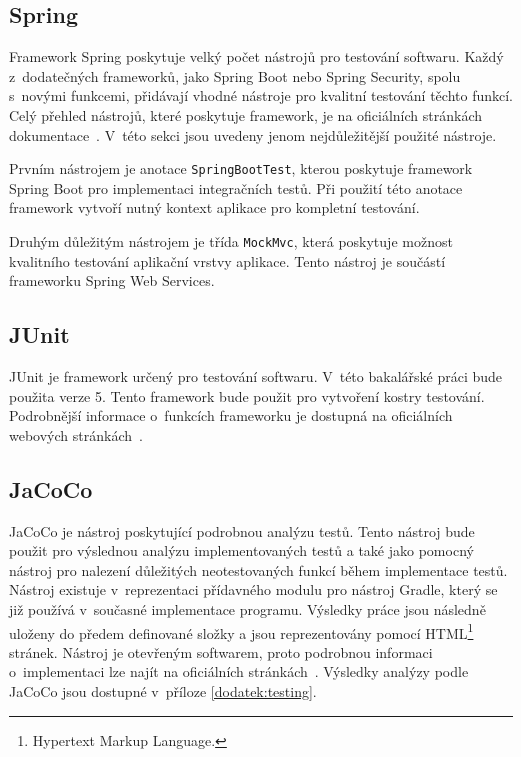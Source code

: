     \subsection{Spring}
        Framework Spring poskytuje velký počet nástrojů pro testování softwaru. Každý z~dodatečných frameworků, jako Spring Boot nebo Spring Security, spolu s~novými funkcemi, přidávají vhodné nástroje pro kvalitní testování těchto funkcí. Celý přehled nástrojů, které poskytuje framework, je na oficiálních stránkách dokumentace~\cite{spring-tests-doc}. V~této sekci jsou uvedeny jenom nejdůležitější použité nástroje.
        
        Prvním nástrojem je anotace \texttt{SpringBootTest}, kterou poskytuje framework Spring Boot pro implementaci integračních testů. Při použití této anotace framework vytvoří nutný kontext aplikace pro kompletní testování.
        
        Druhým důležitým nástrojem je třída \texttt{MockMvc}, která poskytuje možnost kvalitního testování aplikační vrstvy aplikace. Tento nástroj je součástí frameworku Spring Web Services.
        
    \subsection{JUnit}
        JUnit je framework určený pro testování softwaru. V~této bakalářské práci bude použita verze 5. Tento framework bude použit pro vytvoření kostry testování. Podrobnější informace o~funkcích frameworku je dostupná na oficiálních webových stránkách~\cite{junit-doc}.
        
    \subsection{JaCoCo}\label{resere:testovani:jacoco}
        JaCoCo je nástroj poskytující podrobnou analýzu testů. Tento nástroj bude použit pro výslednou analýzu implementovaných testů a také jako pomocný nástroj pro nalezení důležitých neotestovaných funkcí během implementace testů. Nástroj existuje v~reprezentaci přídavného modulu pro nástroj Gradle, který se již používá v~současné implementace programu. Výsledky práce jsou následně uloženy do předem definované složky a jsou reprezentovány pomocí HTML\footnote{Hypertext Markup Language.} stránek. Nástroj je otevřeným softwarem, proto podrobnou informaci o~implementaci lze najít na oficiálních stránkách~\cite{jacoco-implementation}. Výsledky analýzy podle JaCoCo jsou dostupné v~příloze \ref{dodatek:testing}.
        
